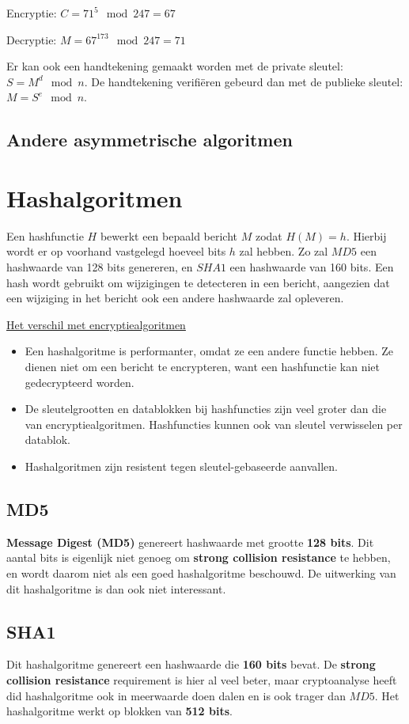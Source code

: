 \documentclass{report}
\begin{document}
	Encryptie: $C = 71^5 \mod 247 = 67$

	Decryptie: $M = 67^{173} \mod 247 = 71$

	Er kan ook een handtekening gemaakt worden met de private sleutel: $S = M^{d} \mod n$. De handtekening verifiëren gebeurd dan met de publieke sleutel: $M = S^{e} \mod n$.

	\subsection{Andere asymmetrische algoritmen}
	\section{Hashalgoritmen}
	Een hashfunctie $H$ bewerkt een bepaald bericht $M$ zodat $H(M) = h$. Hierbij wordt er op voorhand vastgelegd hoeveel bits $h$ zal hebben. Zo zal $MD5$ een hashwaarde van 128 bits genereren, en $SHA1$ een hashwaarde van 160 bits. Een hash wordt gebruikt om wijzigingen te detecteren in een bericht, aangezien dat een wijziging in het bericht ook een andere hashwaarde zal opleveren.

	\underline{Het verschil met encryptiealgoritmen}
	\begin{itemize}
		\item[\info] Een hashalgoritme is performanter, omdat ze een andere functie hebben. Ze dienen niet om een bericht te encrypteren, want een hashfunctie kan niet gedecrypteerd worden.
		\item[\info] De sleutelgrootten en datablokken bij hashfuncties zijn veel groter dan die van encryptiealgoritmen. Hashfuncties kunnen ook van sleutel verwisselen per datablok.
		\item[\info] Hashalgoritmen zijn resistent tegen sleutel-gebaseerde aanvallen.
	\end{itemize}

	\subsection{MD5}
	\textbf{Message Digest (MD5)} genereert hashwaarde met grootte \textbf{128 bits}. Dit aantal bits is eigenlijk niet genoeg om \textbf{strong collision resistance} te hebben, en wordt daarom niet als een goed hashalgoritme beschouwd. De uitwerking van dit hashalgoritme is dan ook niet interessant.
	\subsection{SHA1}
	Dit hashalgoritme genereert een hashwaarde die \textbf{160 bits} bevat. De \textbf{strong collision resistance} requirement is hier al veel beter, maar cryptoanalyse heeft did hashalgoritme ook in meerwaarde doen dalen en is ook trager dan $MD5$. Het hashalgoritme werkt op blokken van \textbf{512 bits}.
\end{document}
